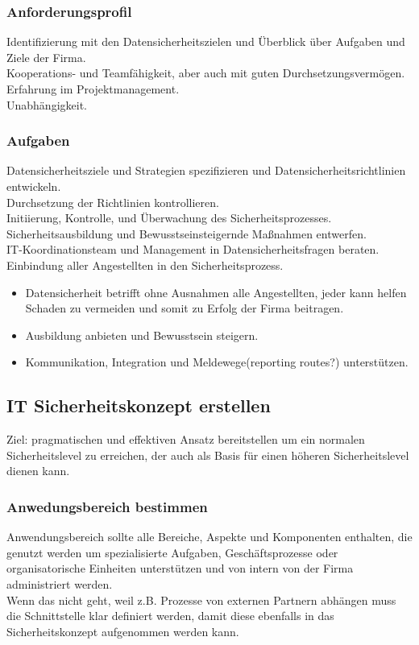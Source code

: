 \documentclass{article} %
\begin{document}
\subsubsection{Anforderungsprofil}
Identifizierung mit den Datensicherheitszielen und Überblick über Aufgaben und Ziele der Firma.\\
Kooperations- und Teamfähigkeit, aber auch mit guten Durchsetzungsvermögen.\\
Erfahrung im Projektmanagement.\\
Unabhängigkeit.
\subsubsection{Aufgaben}
Datensicherheitsziele und Strategien spezifizieren und Datensicherheitsrichtlinien entwickeln.\\
Durchsetzung der Richtlinien kontrollieren.\\
Initiierung, Kontrolle, und Überwachung des Sicherheitsprozesses.\\
Sicherheitsausbildung und Bewusstseinsteigernde Maßnahmen entwerfen.\\
IT-Koordinationsteam und Management in Datensicherheitsfragen beraten.
Einbindung aller Angestellten in den Sicherheitsprozess.
\begin{itemize}
	\item Datensicherheit betrifft ohne Ausnahmen alle Angestellten, jeder kann helfen Schaden zu vermeiden und somit zu Erfolg der Firma beitragen.
    \item Ausbildung anbieten und Bewusstsein steigern.
    \item Kommunikation, Integration und Meldewege(reporting routes?) unterstützen.
\end{itemize}
\subsection{IT Sicherheitskonzept erstellen}
Ziel: pragmatischen und effektiven Ansatz bereitstellen um ein normalen Sicherheitslevel zu erreichen, der auch als Basis für einen höheren Sicherheitslevel dienen kann.\\
\subsubsection{Anwedungsbereich bestimmen}
Anwendungsbereich sollte alle Bereiche, Aspekte und Komponenten enthalten, die genutzt werden um spezialisierte Aufgaben, Geschäftsprozesse oder organisatorische Einheiten unterstützen und von intern von der Firma administriert werden.\\
Wenn das nicht geht, weil z.B. Prozesse von externen Partnern abhängen muss die Schnittstelle klar definiert werden, damit diese ebenfalls in das Sicherheitskonzept aufgenommen werden kann.
\end{document}
